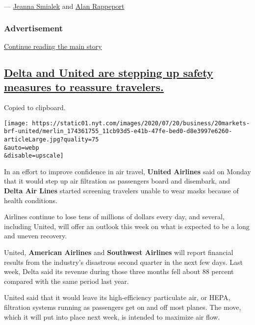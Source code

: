--- \href{https://www.nytimes.com/by/jeanna-smialek}{Jeanna Smialek} and
\href{https://www.nytimes.com/by/alan-rappeport}{Alan Rappeport}

\hypertarget{advertisement-1}{%
\subsubsection{Advertisement}\label{advertisement-1}}

\protect\hyperlink{after-dfp-ad-mid2}{Continue reading the main story}

\hypertarget{delta-and-united-are-stepping-up-safety-measures-to-reassure-travelers}{%
\subsection{\texorpdfstring{\protect\hyperlink{delta-and-united-are-stepping-up-safety-measures-to-reassure-travelers}{Delta
and United are stepping up safety measures to reassure
travelers.}}{Delta and United are stepping up safety measures to reassure travelers.}}\label{delta-and-united-are-stepping-up-safety-measures-to-reassure-travelers}}

Copied to clipboard.

\texttt{[image: https://static01.nyt.com/images/2020/07/20/business/20markets-brf-united/merlin\_174361755\_11cb93d5-e41b-47fe-bed0-d8e3997e6260-articleLarge.jpg?quality=75\\\&auto=webp\\\&disable=upscale]}

In an effort to improve confidence in air travel, \textbf{United
Airlines} said on Monday that it would step up air filtration as
passengers board and disembark, and \textbf{Delta Air Lines} started
screening travelers unable to wear masks because of health conditions.

Airlines continue to lose tens of millions of dollars every day, and
several, including United, will offer an outlook this week on what is
expected to be a long and uneven recovery.

United, \textbf{American Airlines} and \textbf{Southwest Airlines} will
report financial results from the industry's disastrous second quarter
in the next few days. Last week, Delta said its revenue during those
three months fell about 88 percent compared with the same period last
year.

United said that it would leave its high-efficiency particulate air, or
HEPA, filtration systems running as passengers get on and off most
planes. The move, which it will put into place next week, is intended to
maximize air flow.

